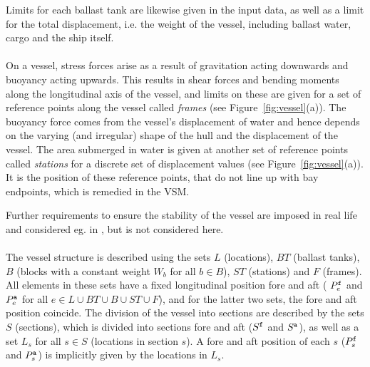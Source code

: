 Limits for each ballast tank are likewise given in the input data, as well as a limit for the total displacement, i.e. the weight of the vessel, including ballast water, cargo and the ship itself. 
%
\\\\
On a vessel, stress forces arise as a result of gravitation acting downwards and buoyancy acting upwards. This results in shear forces and bending moments along the longitudinal axis of the vessel, and limits on these are given for a set of reference points along the vessel called \emph{frames} (see Figure~\ref{fig:vessel}(a)). 
%
The buoyancy force comes from the vessel's displacement of water and hence depends on the varying (and irregular) shape of the hull and the displacement of the vessel. The area submerged in water is given at another set of reference points called \emph{stations} for a discrete set of displacement values (see Figure~\ref{fig:vessel}(a)).
It is the position of these reference points, that do not line up with bay endpoints, which is remedied in the VSM.

Further requirements to ensure the stability of the vessel are imposed in real life and considered eg. in \cite{AlbertosThesis}, but is not considered here.
\\\\
The vessel structure is described using the sets $L$ (locations), $BT$ (ballast tanks), $B$ (blocks with a constant weight $W_b$ for all $b\in B$), $ST$ (stations) and $F$ (frames). All elements in these sets have a fixed longitudinal position fore and aft ( $P^{\texttt{f}}_e$ and $P^{\texttt{a}}_e$ for all $e\in L\cup BT \cup B \cup ST \cup F$), and for the latter two sets, the fore and aft position coincide. %
%
The division of the vessel into sections are described by the sets $S$ (sections), which is divided into sections fore and aft ($S^{\texttt{f}}$ and $S^{\texttt{a}}$), as well as a set $L_s$ for all $s\in S$ (locations in section $s$). A fore and aft position of each $s$ ($P^{\texttt{f}}_s$ and $P^{\texttt{a}}_s$) is implicitly given by the locations in $L_s$.%

